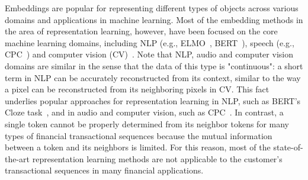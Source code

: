 \documentclass[sigconf]{acmart}
\begin{document}

Embeddings are popular for representing different types of objects across various domains and applications in machine learning. 
Most of the embedding methods in the area of representation learning, however, have been focused on the core machine learning domains, including NLP (e.g., ELMO~\citep{Peters2018DeepCW}, BERT~\citep{Devlin2019BERTPO}), speech (e.g., CPC~\citep{Oord2018RepresentationLW}) and computer vision (CV)~\citep{Doersch2015UnsupervisedVR, Oord2018RepresentationLW}.
Note that NLP, audio and computer vision domains are similar in the sense that the data of this type is "continuous": a short term in NLP can be accurately reconstructed from its context, similar to the way a pixel can be reconstructed from its neighboring pixels in CV. This fact underlies popular approaches for representation learning in NLP, such as BERT’s Cloze task~\citep{Devlin2019BERTPO}, and in audio and computer vision, such as CPC~\citep{Oord2018RepresentationLW}. In contrast, a single token cannot be properly determined from its neighbor tokens for many types of financial transactional sequences because the mutual information between a token and its neighbors is limited. For this reason, most of the state-of-the-art representation learning methods are not applicable to the customer's transactional sequences in many financial applications.


\end{document}
